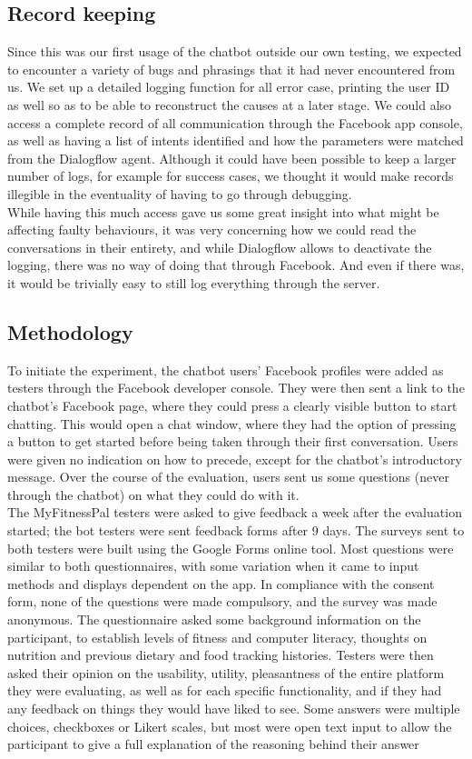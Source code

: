 \subsection{Record keeping}
Since this was our first usage of the chatbot outside our own testing, we expected to encounter a variety of bugs and phrasings that it had never encountered from us. We set up a detailed logging function for all error case, printing the user ID as well so as to be able to reconstruct the causes at a later stage. We could also access a complete record of all communication through the Facebook app console, as well as having a list of intents identified and how the parameters were matched from the Dialogflow agent. Although it could have been possible to keep a larger number of logs, for example for success cases, we thought it would make records illegible in the eventuality of having to go through debugging.\\
While having this much access gave us some great insight into what might be affecting faulty behaviours, it was very concerning how we could read the conversations in their entirety, and while Dialogflow allows to deactivate the logging, there was no way of doing that through Facebook. And even if there was, it would be trivially easy to still log everything through the server.
\subsection{Methodology}
To initiate the experiment, the chatbot users' Facebook profiles were added as testers through the Facebook developer console. They were then sent a link to the chatbot's Facebook page, where they could press a clearly visible button to start chatting. This would open a chat window, where they had the option of pressing a button to get started before being taken through their first conversation. Users were given no indication on how to precede, except for the chatbot's introductory message. Over the course of the evaluation, users sent us some questions (never through the chatbot) on what they could do with it. \\
The MyFitnessPal testers were asked to give feedback a week after the evaluation started; the bot testers were sent feedback forms after 9 days.
The surveys sent to both testers were built using the Google Forms online tool. Most questions were similar to both questionnaires, with some variation when it came to input methods and displays dependent on the app. In compliance with the consent form, none of the questions were made compulsory, and the survey was made anonymous.
The questionnaire asked some background information on the participant, to establish levels of fitness and computer literacy, thoughts on nutrition and previous dietary and food tracking histories.
Testers were then asked their opinion on the usability, utility, pleasantness of the entire platform they were evaluating, as well as for each specific functionality, and if they had any feedback on things they would have liked to see. Some answers were multiple choices, checkboxes or Likert scales, but most were open text input to allow the participant to give a full explanation of the reasoning behind their answer
